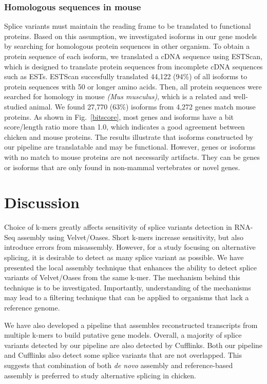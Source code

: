 \documentclass[10pt]{article}
\begin{document}
\subsubsection*{Homologous sequences in mouse}
Splice variants must maintain the reading frame to be translated to functional proteins.
Based on this assumption, we investigated isoforms in our gene models by searching for homologous protein sequences in
other organism.
To obtain a protein sequence of each isoform, we translated a cDNA sequence using ESTScan\cite{Iseli:1999vd},
which is designed to translate
protein sequences from incomplete cDNA sequences such as ESTs.
ESTScan succesfully translated 44,122 (94\%) of all isoforms to protein sequences with 50 or longer amino acids.
Then, all protein sequences were searched for homology in mouse \textit{(Mus musculus)}, which is a related and well-studied animal.
We found 27,770 (63\%) isoforms from 4,272 genes match mouse proteins.
As shown in Fig.~\ref{bitscore}, most genes and isoforms have a bit score/length ratio more than 1.0, which
indicates a good agreement between chicken and mouse proteins.
The results illustrate that isoforms constructed by our pipeline are translatable and may be functional.
However, genes or isoforms with no match to mouse proteins are not necessarily artifacts.
They can be genes or isoforms that are only found in non-mammal vertebrates or novel genes.

\section*{Discussion}

Choice of k-mers greatly affects sensitivity of splice variants detection in RNA-Seq assembly using Velvet/Oases.
Short k-mers increase sensitivity, but also introduce errors from misassembly.
However, for a study focusing on alternative splicing, it is desirable to detect as many splice variant as possible.
We have presented the local assembly technique that enhances the ability to detect splice variants of Velvet/Oases from the same
k-mer.
The mechanism behind this technique is to be investigated.
Importantly, understanding of the mechanisms may lead to a filtering technique that can be applied to organisms that lack a reference genome.

We have also developed a pipeline that assembles reconstructed transcripts from multiple k-mers to build putative gene models.
Overall, a majority of splice variants detected by our pipeline are also detected by Cufflinks.
Both our pipeline and Cufflinks also detect some splice variants that are not overlapped.
This suggests that combination of both \emph{de novo} assembly and reference-based assembly is preferred to study alternative splicing in chicken.
\end{document}
